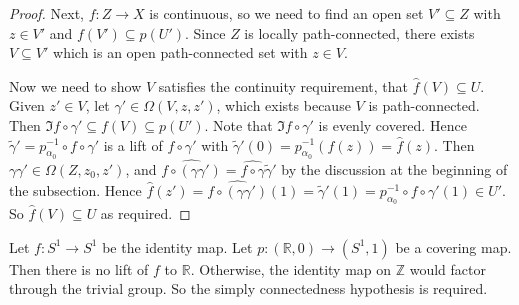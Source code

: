 \begin{proof}
	Next, \( f \colon Z \to X \) is continuous, so we need to find an open set \( V' \subseteq Z \) with \( z \in V' \) and \( f(V') \subseteq p(U') \).
	Since \( Z \) is locally path-connected, there exists \( V \subseteq V' \) which is an open path-connected set with \( z \in V \).

	Now we need to show \( V \) satisfies the continuity requirement, that \( \hat f(V) \subseteq U \).
	Given \( z' \in V \), let \( \gamma' \in \Omega(V,z,z') \), which exists because \( V \) is path-connected.
	Then \( \Im f \circ \gamma' \subseteq f(V) \subseteq p(U') \).
	Note that \( \Im f \circ \gamma' \) is evenly covered.
	Hence \( \widetilde \gamma' = p_{\alpha_0}^{-1} \circ f \circ \gamma' \) is a lift of \( f \circ \gamma' \) with \( \widetilde \gamma'(0) = p_{\alpha_0}^{-1}(f(z)) = \hat f(z) \).
	Then \( \gamma\gamma' \in \Omega(Z,z_0,z') \), and \( \widehat{f \circ (\gamma\gamma')} = \widehat{f \circ \gamma} \widetilde \gamma' \) by the discussion at the beginning of the subsection.
	Hence \( \hat f(z') = \widehat{f \circ (\gamma\gamma')}(1) = \widetilde\gamma'(1) = p_{\alpha_0}^{-1} \circ f \circ \gamma'(1) \in U' \).
	So \( \hat f(V) \subseteq U \) as required.
\end{proof}
\begin{example}
	Let \( f \colon S^1 \to S^1 \) be the identity map.
	Let \( p \colon (\mathbb R, 0) \to (S^1, 1) \) be a covering map.
	Then there is no lift of \( f \) to \( \mathbb R \).
	Otherwise, the identity map on \( \mathbb Z \) would factor through the trivial group.
	So the simply connectedness hypothesis is required.
\end{example}

